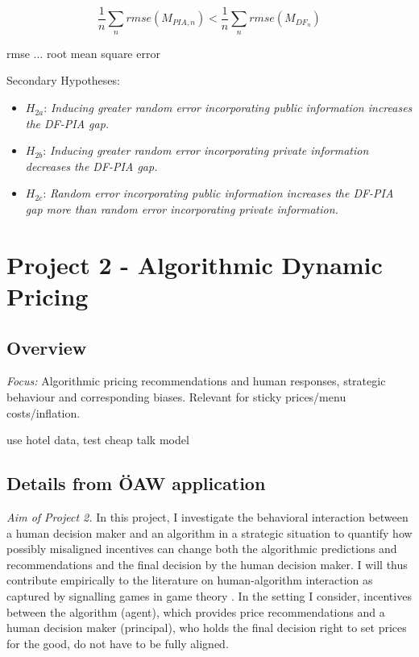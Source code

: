 \documentclass[12pt,a4paper]{article}
\begin{document}
\[ \frac{1}{n}\sum_{n} rmse(M_{PIA, n}) < \frac{1}{n}\sum_{n} rmse(M_{DF_n})\]


rmse ... root mean square error

Secondary Hypotheses: 

\begin{itemize}

	\item $H_{2a}$: \emph{Inducing greater random error incorporating public information increases the DF-PIA gap.}
	\item $H_{2b}$: \emph{Inducing greater random error incorporating private information decreases the DF-PIA gap.}
	\item $H_{2c}$: \emph{Random error incorporating public information increases the DF-PIA gap more than random error incorporating private information.}

\end{itemize}




\section{Project 2 - Algorithmic Dynamic Pricing}
\label{sec:2}

\subsection{Overview}
	\emph{Focus:} Algorithmic pricing recommendations and human responses, strategic behaviour and corresponding biases. Relevant for sticky prices/menu costs/inflation.

use hotel data, test cheap talk model

\subsection{Details from ÖAW application}

\emph{Aim of Project 2.} In this project, I investigate the behavioral interaction between a human decision maker and an algorithm in a strategic situation to quantify how possibly misaligned incentives can change both the algorithmic predictions and recommendations and the final decision by the human decision maker. I will thus contribute empirically to the literature on human-algorithm interaction as captured by signalling games in game theory \citep{backus2019empirical}. In the setting I consider, incentives between the algorithm (agent), which provides price recommendations and a human decision maker (principal), who holds the final decision right to set prices for the good, do not have to be fully aligned.
\end{document}
